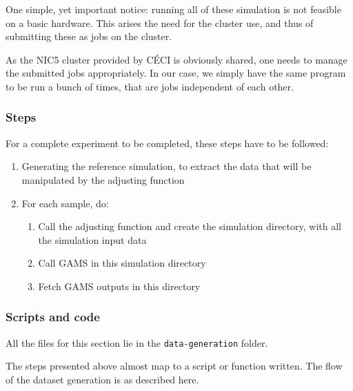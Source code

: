 One simple, yet important notice: running all of these simulation is not feasible on a basic hardware. This arises the need for the cluster use, and thus of submitting these as jobs on the cluster.

As the NIC5 cluster provided by CÉCI is obviously shared, one needs to manage the submitted jobs appropriately. In our case, we simply have the same program to be run a bunch of times, that are jobs independent of each other.

\subsubsection{Steps}
For a complete experiment to be completed, these steps have to be followed:
\begin{enumerate}
    \item Generating the reference simulation, to extract the data that will be manipulated by the adjusting function
    \item For each sample, do:
    \begin{enumerate}
        \item Call the adjusting function and create the simulation directory, with all the simulation input data
        \item Call GAMS in this simulation directory
        \item Fetch GAMS outputs in this directory
    \end{enumerate}
\end{enumerate}

\subsubsection{Scripts and code}

All the files for this section lie in the \texttt{data-generation} folder.

The steps presented above almost map to a script or function written. The flow of the dataset generation is as described here.


